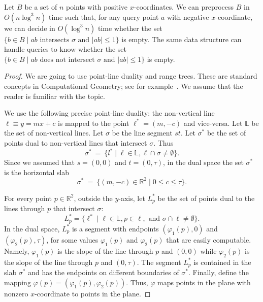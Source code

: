 \documentclass[a4paper,USenglish]{lipics}
\newcommand{\RR}{\ensuremath{\mathbb R}}  %
\newcommand{\LL}{\ensuremath{\mathbb L}}  %
\let\le\leqslant
\begin{document}
\begin{lemma}
\label{lem:block}
	Let $B$ be a set of $n$ points with positive $x$-coordinates.
	We can preprocess $B$ in $O(n\log^3 n)$ time such that,
	for any query point $a$	with negative $x$-coordinate, 
	we can decide in $O(\log^3 n)$ time whether the set 
	$\{ b\in B \mid \text{$ab$ intersects $\sigma$ and $|ab|\le 1$}\}$
	is empty.
	The same data structure can handle queries
	to know whether the set
	$\{ b\in B \mid \text{$ab$ does not intersect $\sigma$ and $|ab|\le 1$}\}$
	is empty.
\end{lemma}
\begin{proof}
	We are going to use point-line duality and range trees.
	These are standard concepts in Computational Geometry;
	see for example~\cite[Chapters 5 and 8]{bkos-08}.
	We assume that the reader is familiar with the topic.
	
	We use the following precise point-line duality: 
	the non-vertical line $\ell \equiv y=mx+c$ 
	is mapped to the point $\ell^*=(m,-c)$ and
	vice-versa. 
	Let $\LL$ be the set of non-vertical lines.
	Let $\sigma$ be the line segment $st$.
	Let $\sigma^*$ be the set of points dual to non-vertical lines that intersect $\sigma$.
	Thus
	\[
		\sigma^* ~=~ \{ l^* \mid \ell\in \LL, \ell\cap \sigma\neq \emptyset\}.
	\]
	Since we assumed that $s=(0,0)$ and $t=(0,\tau)$, 
	in the dual space the set $\sigma^*$ is the horizontal slab 
	\[
		\sigma^* ~=~ \{ (m,-c)\in \RR^2\mid 0\le c\le \tau\}.
	\]
	
	For every point $p\in \RR^2$, outside the $y$-axis, 
	let $L^* _p$ be the set of points dual
	to the lines through $p$ that intersect $\sigma$:
	\[
		L^*_p=\{ \ell^* \mid \ell\in \LL, p \in \ell, \text{ and } \sigma\cap \ell\not= \emptyset\}.
	\]
	In the dual space, $L^*_p$ is a segment with endpoints 
	$(\varphi_1(p),0)$ and $(\varphi_2(p),\tau)$, 
	for some values $\varphi_1(p)$ and $\varphi_2(p)$
	that are easily computable.
	Namely, $\varphi_1(p)$ is the slope of the line through $p$
	and $(0,0)$ while $\varphi_2(p)$ is the slope of the line through $p$ and $(0,\tau)$.
	The segment $L^*_p$ is contained in the slab $\sigma^*$ and has the endpoints on
	different boundaries of $\sigma^*$.
	Finally, define the mapping $\varphi(p)=(\varphi_1(p),\varphi_2(p))$.
	Thus, $\varphi$ maps points in the plane with nonzero $x$-coordinate
	to points in the plane. 


\end{proof}
\end{document}
